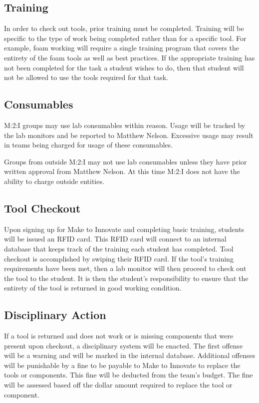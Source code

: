 \subsection{Training}
In order to check out tools, prior training must be completed. Training will be specific to the type of work being completed rather than for a specific tool. For example, foam working will require a single training program that covers the entirety of the foam tools as well as best practices. If the appropriate training has not been completed for the task a student wishes to do, then that student will not be allowed to use the tools required for that task.
\subsection{Consumables}
M:2:I groups may use lab consumables within reason.  Usage will be tracked by the lab monitors and be reported to Matthew Nelson.  Excessive usage may result in teams being charged for usage of these consumables.

Groups from outside M:2:I may not use lab consumables unless they have prior written approval from Matthew Nelson.  At this time M:2:I does not have the ability to charge outside entities.
\subsection{Tool Checkout}
Upon signing up for Make to Innovate and completing basic training, students will be issued an RFID card. This RFID card will connect to an internal database that keeps track of the training each student has completed. Tool checkout is accomplished by swiping their RFID card. If the tool’s training requirements have been met, then a lab monitor will then proceed to check out the tool to the student. It is then the student’s responsibility to ensure that the entirety of the tool is returned in good working condition.
\subsection{Disciplinary Action}
If a tool is returned and does not work or is missing components that were present upon checkout, a disciplinary system will be enacted. The first offense will be a warning and will be marked in the internal database. Additional offenses will be punishable by a fine to be payable to Make to Innovate to replace the tools or components. This fine will be deducted from the team’s budget. The fine will be assessed based off the dollar amount required to replace the tool or component. 
